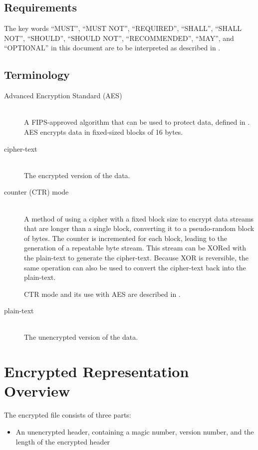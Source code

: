 \documentclass[10pt]{article}
\begin{document}
{\subsection{Requirements}
The key words ``MUST'', ``MUST NOT'', ``REQUIRED'', ``SHALL'', ``SHALL NOT'', ``SHOULD'', ``SHOULD NOT'',
``RECOMMENDED'', ``MAY'', and ``OPTIONAL'' in this document are to be interpreted as described in \cite{RFC2119}.

\subsection{Terminology}
\begin{description}
\item[Advanced Encryption Standard (AES)]~\\
A FIPS-approved algorithm that can be used to protect data, defined in
\cite{AESSTD}.
AES encrypts data in fixed-sized blocks of 16 bytes.

\item[cipher-text]~\\
The encrypted version of the data.

\item[counter (CTR) mode]~\\
A method of using a cipher with a fixed block size to encrypt data streams that are longer than a single block,
converting it to a pseudo-random block of bytes.
The counter is incremented for each block, leading to the generation of a repeatable byte stream.
This stream can be XORed with the plain-text to generate the cipher-text.
Because XOR is reversible, the same operation can also be used to convert the cipher-text back into the plain-text.

CTR mode and its use with AES are described in \cite{CTRMODE}.

\item[plain-text]~\\
The unencrypted version of the data.
 
\end{description}

\section{Encrypted Representation Overview}
The encrypted file consists of three parts:

\begin{itemize}
\item An unencrypted header, containing a magic number, version number, and the length of the encrypted header


\end{itemize}}
\end{document}
